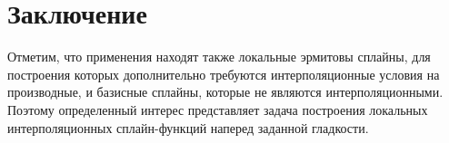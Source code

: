 \section{Заключение}
Отметим, что применения находят также локальные эрмитовы сплайны,
для построения которых
дополнительно требуются интерполяционные условия на производные,
и базисные сплайны, которые не являются интерполяционными.
Поэтому определенный интерес представляет задача построения локальных
интерполяционных сплайн-функций наперед заданной гладкости.




































